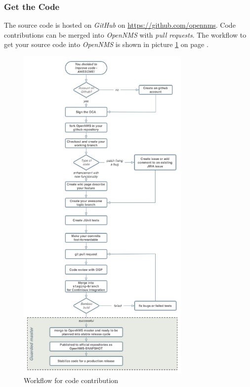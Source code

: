 \subsubsection{Get the Code}
The source code is hosted on \emph{GitHub} on \url{https://github.com/opennms}. Code contributions can be merged into \emph{OpenNMS} with \emph{pull requests}. The workflow to get your source code into \emph{OpenNMS} is shown in picture \ref{fig:contrib-workflow} on page \pageref{fig:contrib-workflow}.

\begin{figure}[h]
	\centering
	\includegraphics[width=0.75\textwidth]{images/contribution-workflow.png}
	\caption{Workflow for code contribution}
	\label{fig:contrib-workflow}
\end{figure}

